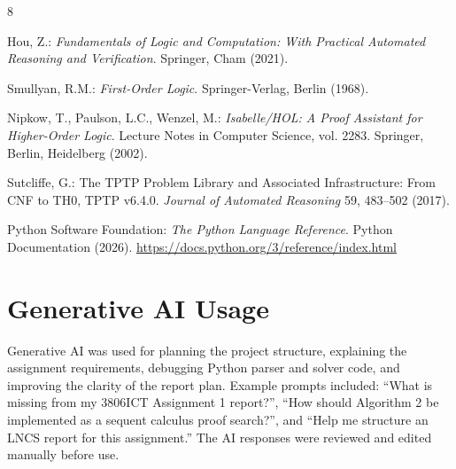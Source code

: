 \documentclass[runningheads]{llncs}
\begin{document}
\begin{thebibliography}{8}

Hou, Z.:
\textit{Fundamentals of Logic and Computation: With Practical Automated Reasoning and Verification}.
Springer, Cham (2021).

Smullyan, R.M.:
\textit{First-Order Logic}.
Springer-Verlag, Berlin (1968).

Nipkow, T., Paulson, L.C., Wenzel, M.:
\textit{Isabelle/HOL: A Proof Assistant for Higher-Order Logic}.
Lecture Notes in Computer Science, vol. 2283.
Springer, Berlin, Heidelberg (2002).

Sutcliffe, G.:
The TPTP Problem Library and Associated Infrastructure: From CNF to TH0, TPTP v6.4.0.
\textit{Journal of Automated Reasoning} 59, 483--502 (2017).

Python Software Foundation:
\textit{The Python Language Reference}.
Python Documentation (2026).
\url{https://docs.python.org/3/reference/index.html}

\end{thebibliography}
\section{Generative AI Usage}

Generative AI was used for planning the project structure, explaining the assignment requirements, debugging Python parser and solver code, and improving the clarity of the report plan. Example prompts included: ``What is missing from my 3806ICT Assignment 1 report?'', ``How should Algorithm 2 be implemented as a sequent calculus proof search?'', and ``Help me structure an LNCS report for this assignment.'' The AI responses were reviewed and edited manually before use.
\end{document}
